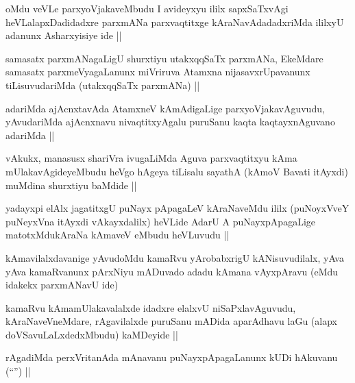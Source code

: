 \begin{artha}
oMdu veVLe parxyoVjakaveMbudu I avideyxyu ililx sapxSaTxvAgi
heVLalapxDadidadxre parxmANa parxvaqtitxge kAraNavAdadadxriMda ililxyU
adanunx Asharxyisiye ide ||
\end{artha}

\begin{artha}
samasatx parxmANagaLigU shurxtiyu utakxqqSaTx parxmANa, EkeMdare
samasatx parxmeVyagaLanunx miVriruva Atamxna nijasavxrUpavanunx
tiLisuvudariMda (utakxqqSaTx parxmANa) ||
\end{artha}

\begin{artha}
adariMda ajAcnxtavAda AtamxneV kAmAdigaLige parxyoVjakavAguvudu,
yAvudariMda ajAcnxnavu nivaqtitxyAgalu puruSanu kaqta kaqtayxnAguvano
adariMda ||
\end{artha}


\begin{artha}
vAkukx, manasusx shariVra ivugaLiMda Aguva parxvaqtitxyu kAma
mUlakavAgideyeMbudu heVgo hAgeya tiLisalu sayathA (kAmoV Bavati
itAyxdi) muMdina shurxtiyu baMdide || 
\end{artha}

\begin{artha}
yadayxpi elAlx jagatitxgU puNayx pApagaLeV kAraNaveMdu ililx
(puNoyxVveY puNeyxVna itAyxdi vAkayxdalilx) heVLide AdarU A
puNayxpApagaLige matotxMdukAraNa kAmaveV eMbudu heVLuvudu ||
\end{artha}

\begin{artha}
kAmavilalxdavanige yAvudoMdu kamaRvu yArobabxrigU kANisuvudilalx, yAva
yAva kamaRvanunx pArxNiyu mADuvado adadu kAmana vAyxpAravu (eMdu
idakekx parxmANavU ide)
\end{artha}

\begin{artha}
kamaRvu kAma\s mUlakavalalxde idadxre elalxvU niSaPxlavAguvudu,
kAraNaveVneMdare, rAgavilalxde puruSanu mADida aparAdhavu laGu (alapx
doVSavuLaLxdedxMbudu) kaMDeyide ||
\end{artha}

\begin{artha}
rAgadiMda perxVritanAda mAnavanu puNayxpApagaLanunx kUDi hAkuvanu
(``\stext'') ||
\end{artha}


